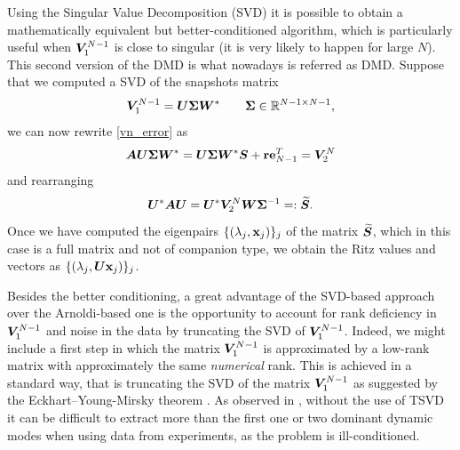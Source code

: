Using the Singular Value Decomposition (SVD) it is possible to obtain a mathematically equivalent but better-conditioned algorithm, which is particularly useful when $\vb*{V}_1^{N-1}$ is close to singular (it is very likely to happen for large $N$). This second version of the DMD is what nowadays is referred as DMD. Suppose that we computed a SVD of the snapshots matrix
\begin{equation*}
    \vb*{V}_1^{N-1} = \vb*{U}\vb*{\Sigma}\vb*{W}^* \qquad \vb*{\Sigma}\in\mathbb{R}^{N-1\times N-1},
\end{equation*}
we can now rewrite \eqref{vn_error} as
\begin{equation}
    \label{vn_error_rewritten}
    \vb*{A}\vb*{U}\vb*{\Sigma}\vb*{W}^* = \vb*{U}\vb*{\Sigma}\vb*{W}^*\vb*{S} + \vb{r}\vb{e}_{N-1}^T = \vb*{V}_2^N
\end{equation}
and rearranging
\begin{equation}
    \label{S_tilde_definition}
    \vb*{U}^*\vb*{A}\vb*{U} = \vb*{U}^*\vb*{V}_2^N\vb*{W}\vb*{\Sigma}^{-1} =: \widetilde{\vb*{S}}.
\end{equation}
Once we have computed the eigenpairs $\{(\lambda_j, \vb{x}_j)\}_j$ of the matrix $\widetilde{\vb*{S}}$, which in this case is a full matrix and not of companion type, we obtain the Ritz values and vectors as $\{(\lambda_j, \vb*{U}\vb{x}_j)\}_j$. 

Besides the better conditioning, a great advantage of the SVD-based approach over the Arnoldi-based one is the opportunity to account for rank deficiency in $\vb*{V}_1^{N-1}$ and noise in the data by truncating the SVD of $\vb*{V}_1^{N-1}$. Indeed, we might include a first step in which the matrix $\vb*{V}_1^{N-1}$ is approximated by a low-rank matrix with approximately the same \emph{numerical} rank. This is achieved in a standard way, that is truncating the SVD of the matrix $\vb*{V}_1^{N-1}$ as suggested by the Eckhart–Young-Mirsky theorem \cite{golub_matrix_2013}. As observed in \cite{schmid_dynamic_2010}, without the use of TSVD it can be difficult to extract more than the first one or two dominant dynamic modes when using data from experiments, as the problem is ill-conditioned. 

